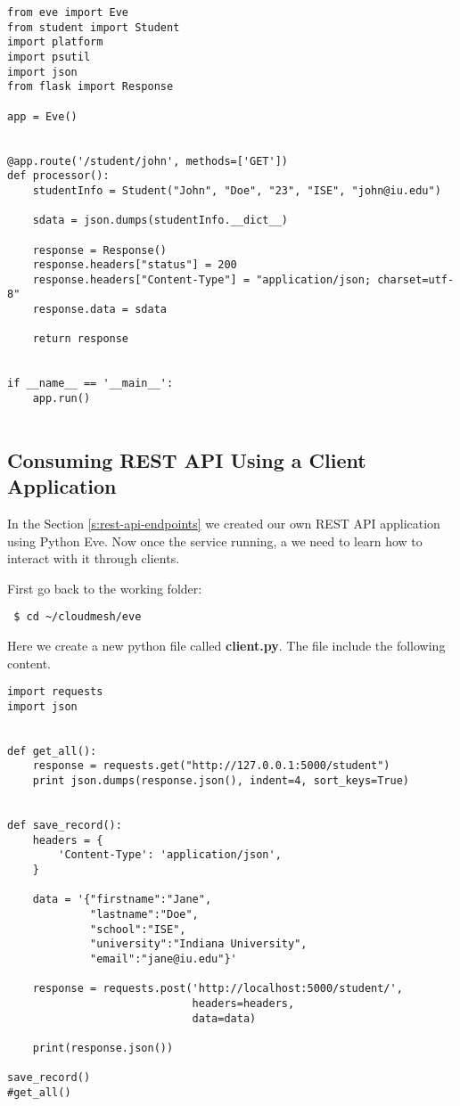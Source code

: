 \begin{lstlisting}
from eve import Eve
from student import Student
import platform
import psutil
import json
from flask import Response

app = Eve()


@app.route('/student/john', methods=['GET'])
def processor():
    studentInfo = Student("John", "Doe", "23", "ISE", "john@iu.edu")

    sdata = json.dumps(studentInfo.__dict__)

    response = Response()
    response.headers["status"] = 200
    response.headers["Content-Type"] = "application/json; charset=utf-8"
    response.data = sdata

    return response


if __name__ == '__main__':
    app.run()


\end{lstlisting}


\subsection{Consuming REST API Using a Client Application}

In the Section \ref{s:rest-api-endpoints} we created our own REST API application
using Python Eve. Now once the service running, a we need to learn how to
interact with it through clients.

First go back to the working folder:

\begin{lstlisting}
 $ cd ~/cloudmesh/eve
\end{lstlisting}

Here we create a new python file called \textbf{client.py}. The file include the
following content.

\begin{lstlisting}
import requests
import json


def get_all():
    response = requests.get("http://127.0.0.1:5000/student")
    print json.dumps(response.json(), indent=4, sort_keys=True)


def save_record():
    headers = {
        'Content-Type': 'application/json',
    }

    data = '{"firstname":"Jane",
             "lastname":"Doe",
             "school":"ISE",
             "university":"Indiana University",
             "email":"jane@iu.edu"}'

    response = requests.post('http://localhost:5000/student/', 
                             headers=headers, 
                             data=data)

    print(response.json())

save_record()
#get_all()
\end{lstlisting}

